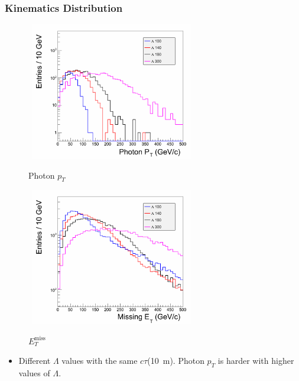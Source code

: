 \documentclass{beamer}
\begin{document}
\begin{frame}
\frametitle{Kinematics Distribution}
\begin{figure}[ht]
\begin{minipage}[b]{0.45\linewidth}
\centering
\mbox{
\includegraphics[height=6cm,width=\textwidth]{THESISPLOTS/GMSB_PhotPt.png}}
\vspace{-1cm}
\caption{Photon $p_{T}$}
\end{minipage}
\hspace{0.1cm}
\begin{minipage}[b]{0.45\linewidth}
\centering
\mbox{
\includegraphics[height=6cm, width=\textwidth]{THESISPLOTS/GMSB_MET.png}}
\vspace{-1cm}
\caption{$E^{\mbox{miss}}_{T}$}
\end{minipage}
\end{figure}
\begin{itemize}
 \item Different $\Lambda$ values with the same $c\tau$(10~m). Photon $p_{T}$ is harder with higher values of $\Lambda$.
\end{itemize}

\end{frame}
\end{document}
